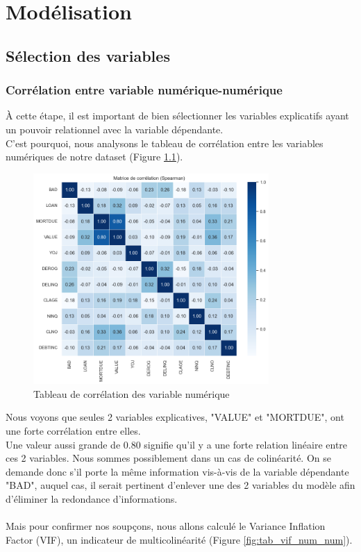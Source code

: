 \documentclass[a4paper,12pt]{report}
\begin{document}
\chapter{Modélisation}

\section{Sélection des variables}

\subsection{Corrélation entre variable numérique-numérique}

À cette étape, il est important de bien sélectionner les variables explicatifs ayant un pouvoir relationnel avec la variable dépendante.\\
C'est pourquoi, nous analysons le tableau de corrélation entre les variables numériques de notre dataset (Figure \ref{fig:tab_corr_num_num}).

\begin{figure}[h!]
  \begin{center}
    \includegraphics[width=0.8\textwidth]{../images/tab_corr_num_num}
  \end{center}
  \caption{Tableau de corrélation des variable numérique}
  \label{fig:tab_corr_num_num}
\end{figure}

Nous voyons que seules 2 variables explicatives, "VALUE" et "MORTDUE", ont une forte corrélation entre elles.\\
Une valeur aussi grande de 0.80 signifie qu'il y a une forte relation linéaire entre ces 2 variables. Nous sommes possiblement dans un cas de colinéarité.
On se demande donc s'il porte la même information vis-à-vis de la variable dépendante "BAD", auquel cas, il serait pertinent d'enlever une des 2 variables du modèle
afin d'éliminer la redondance d'informations.\\
\\
Mais pour confirmer nos soupçons, nous allons calculé le Variance Inflation Factor (VIF), un indicateur de multicolinéarité (Figure \ref{fig:tab_vif_num_num}).
\end{document}
